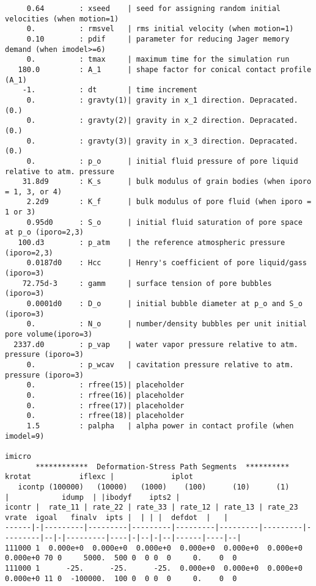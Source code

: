 \begin{verbatim}
     0.64        : xseed    | seed for assigning random initial velocities (when motion=1)
     0.          : rmsvel   | rms initial velocity (when motion=1)
     0.10        : pdif     | parameter for reducing Jager memory demand (when imodel>=6)
     0.          : tmax     | maximum time for the simulation run
   180.0         : A_1      | shape factor for conical contact profile (A_1)
    -1.          : dt       | time increment
     0.          : gravty(1)| gravity in x_1 direction. Depracated. (0.)
     0.          : gravty(2)| gravity in x_2 direction. Depracated. (0.)
     0.          : gravty(3)| gravity in x_3 direction. Depracated. (0.)
     0.          : p_o      | initial fluid pressure of pore liquid relative to atm. pressure
    31.8d9       : K_s      | bulk modulus of grain bodies (when iporo = 1, 3, or 4)
     2.2d9       : K_f      | bulk modulus of pore fluid (when iporo = 1 or 3)
     0.95d0      : S_o      | initial fluid saturation of pore space at p_o (iporo=2,3)
   100.d3        : p_atm    | the reference atmospheric pressure (iporo=2,3)
     0.0187d0    : Hcc      | Henry's coefficient of pore liquid/gass (iporo=3)
    72.75d-3     : gamm     | surface tension of pore bubbles (iporo=3)
     0.0001d0    : D_o      | initial bubble diameter at p_o and S_o (iporo=3)
     0.          : N_o      | number/density bubbles per unit initial pore volume(iporo=3)
  2337.d0        : p_vap    | water vapor pressure relative to atm. pressure (iporo=3)
     0.          : p_wcav   | cavitation pressure relative to atm. pressure (iporo=3)
     0.          : rfree(15)| placeholder
     0.          : rfree(16)| placeholder
     0.          : rfree(17)| placeholder
     0.          : rfree(18)| placeholder
     1.5         : palpha   | alpha power in contact profile (when imodel=9)
                                                                                                   imicro
       ************  Deformation-Stress Path Segments  **********             krotat           iflexc |             iplot
   icontp (100000)   (10000)   (1000)    (100)      (10)      (1)                 |            idump  | |ibodyf    ipts2 |
icontr |  rate_11 | rate_22 | rate_33 | rate_12 | rate_13 | rate_23    vrate  igoal   finalv  ipts |  | | |  defdot  |   |
------|-|---------|---------|---------|---------|---------|---------|---------|--|-|---------|----|-|--|-|--|------|----|--|
111000 1  0.000e+0  0.000e+0  0.000e+0  0.000e+0  0.000e+0  0.000e+0  0.000e+0 70 0     5000.  500 0  0 0  0     0.    0  0
111000 1      -25.      -25.      -25.  0.000e+0  0.000e+0  0.000e+0  0.000e+0 11 0  -100000.  100 0  0 0  0     0.    0  0

\end{verbatim}
